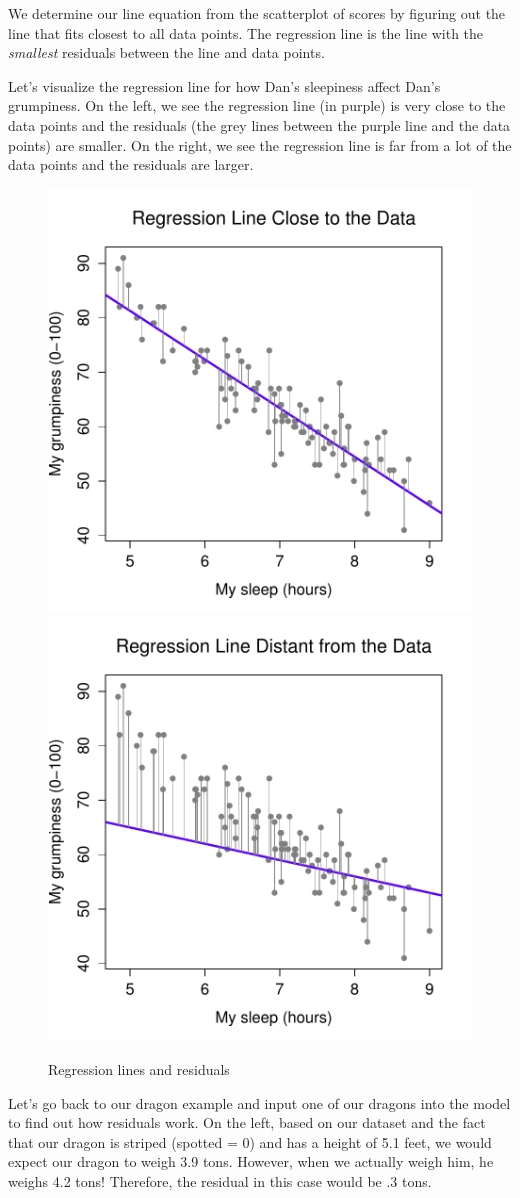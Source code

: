 \documentclass[
]{book}
\begin{document}
We determine our line equation from the scatterplot of scores by figuring out the line that fits closest to all data points. The regression line is the line with the \emph{smallest} residuals between the line and data points.

Let's visualize the regression line for how Dan's sleepiness affect Dan's grumpiness. On the left, we see the regression line (in purple) is very close to the data points and the residuals (the grey lines between the purple line and the data points) are smaller. On the right, we see the regression line is far from a lot of the data points and the residuals are larger.

\begin{figure}

{\centering \includegraphics[width=0.49\linewidth]{images/13-regression/good-regression-line} \includegraphics[width=0.49\linewidth]{images/13-regression/bad-regression-line} 

}

\caption{Regression lines and residuals}\label{fig:unnamed-chunk-3}
\end{figure}

Let's go back to our dragon example and input one of our dragons into the model to find out how residuals work. On the left, based on our dataset and the fact that our dragon is striped (spotted = 0) and has a height of 5.1 feet, we would expect our dragon to weigh 3.9 tons. However, when we actually weigh him, he weighs 4.2 tons! Therefore, the residual in this case would be .3 tons.
\end{document}

